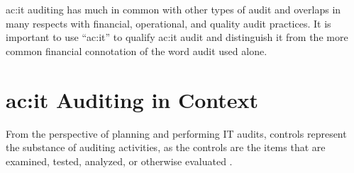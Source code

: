 
\gls{ac:it} auditing has much in common with other types of audit and overlaps in many respects with financial, operational, and quality audit practices. It is important to use “\gls{ac:it}” to qualify \gls{ac:it} audit and distinguish it from the more common financial connotation of the word audit used alone. 





\section{\gls{ac:it} Auditing in Context}

From the perspective of planning and performing IT audits, controls represent the substance of auditing activities, as the controls are the items that are examined, tested, analyzed, or otherwise evaluated \citep{GANTZ20141}.

